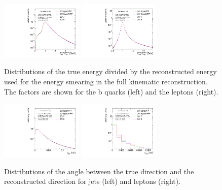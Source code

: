 \begin{figure}[htb]
    \begin{center}
        \includegraphics[width=0.35\textwidth]{fig_fullRun2UL/SmearingPlots/ULcomp_KinReco_fE_jet_step7.pdf}
        \includegraphics[width=0.35\textwidth]{fig_fullRun2UL/SmearingPlots/ULcomp_KinReco_fE_lep_step7.pdf}
        \caption{\small Distributions of the true energy divided by the reconstructed energy used for the energy smearing in the \ttbar full kinematic reconstruction. 
        The factors are shown for the b quarks (left) and the leptons (right).}
    \label{fig:energyFactor}
    \end{center}
\end{figure}

\begin{figure}[htb]
    \begin{center}
        \includegraphics[width=0.35\textwidth]{fig_fullRun2UL/SmearingPlots/ULcomp_KinReco_d_angle_jet_step7.pdf}
        \includegraphics[width=0.35\textwidth]{fig_fullRun2UL/SmearingPlots/ULcomp_KinReco_d_angle_lep_step7.pdf}
        \caption{\small Distributions of the angle between the true direction and the reconstructed direction for jets (left) and leptons (right).}
       \label{fig:angleFactor}
    \end{center}
\end{figure}

